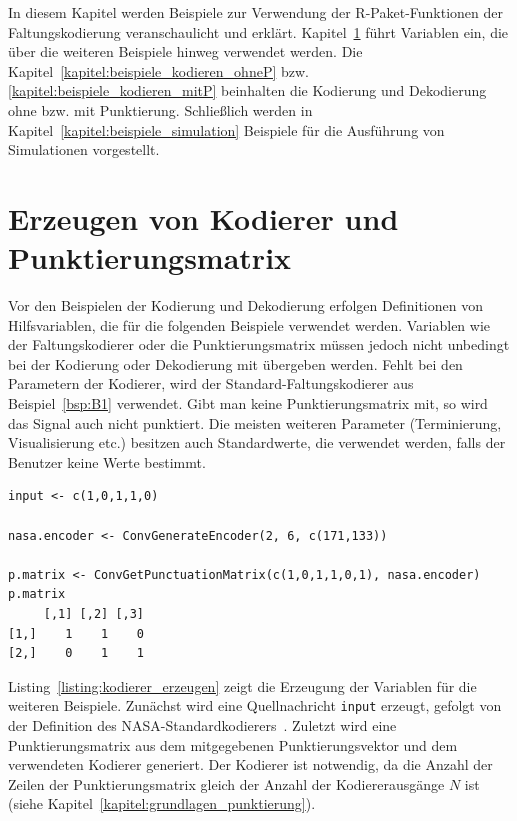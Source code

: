 In diesem Kapitel werden Beispiele zur Verwendung der R-Paket-Funktionen der Faltungskodierung veranschaulicht und erklärt. Kapitel~\ref{kapitel:beispiele_kodierer} führt Variablen ein, die über die weiteren Beispiele hinweg verwendet werden. Die Kapitel~\ref{kapitel:beispiele_kodieren_ohneP} bzw. \ref{kapitel:beispiele_kodieren_mitP} beinhalten die Kodierung und Dekodierung ohne bzw. mit Punktierung. Schließlich werden in Kapitel~\ref{kapitel:beispiele_simulation} Beispiele für die Ausführung von Simulationen vorgestellt. 

\section{Erzeugen von Kodierer und Punktierungsmatrix}
\label{kapitel:beispiele_kodierer}
Vor den Beispielen der Kodierung und Dekodierung erfolgen Definitionen von Hilfsvariablen, die für die folgenden Beispiele verwendet werden. Variablen wie der Faltungskodierer oder die Punktierungsmatrix müssen jedoch nicht unbedingt bei der Kodierung oder Dekodierung mit übergeben werden. Fehlt bei den Parametern der Kodierer, wird der Standard-Faltungskodierer aus Beispiel~\ref{bsp:B1} verwendet. Gibt man keine Punktierungsmatrix mit, so wird das Signal auch nicht punktiert. Die meisten weiteren Parameter (Terminierung, Visualisierung etc.) besitzen auch Standardwerte, die verwendet werden, falls der Benutzer keine Werte bestimmt.
\begin{lstlisting}[caption=Erzeugung von Kodierer und Punktierungsmatrix, label={listing:kodierer_erzeugen}, float=!th]
input <- c(1,0,1,1,0)
 
nasa.encoder <- ConvGenerateEncoder(2, 6, c(171,133))

p.matrix <- ConvGetPunctuationMatrix(c(1,0,1,1,0,1), nasa.encoder)
p.matrix
     [,1] [,2] [,3]
[1,]    1    1    0
[2,]    0    1    1
\end{lstlisting}
Listing~\ref{listing:kodierer_erzeugen} zeigt die Erzeugung der Variablen für die weiteren Beispiele. Zunächst wird eine Quellnachricht \texttt{input} erzeugt, gefolgt von der Definition des NASA-Standardkodierers~\cite[S.~90]{morelos2006art}. Zuletzt wird eine Punktierungsmatrix aus dem mitgegebenen Punktierungsvektor und dem verwendeten Kodierer generiert. Der Kodierer ist notwendig, da die Anzahl der Zeilen der Punktierungsmatrix gleich der Anzahl der Kodiererausgänge $N$ ist (siehe Kapitel~\ref{kapitel:grundlagen_punktierung}).

